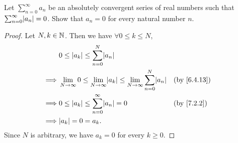 \begin{ex}\label{ex:7.3.3}
  Let \(\sum_{n = 0}^\infty a_n\) be an absolutely convergent series of real numbers such that \(\sum_{n = 0}^\infty \abs{a_n} = 0\).
  Show that \(a_n = 0\) for every natural number \(n\).
\end{ex}

\begin{proof}
  Let \(N, k \in \mathbb{N}\).
  Then we have \(\forall 0 \leq k \leq N\),
  \begin{align*}
             & 0 \leq \abs{a_k} \leq \sum_{n = 0}^N \abs{a_n}                                                                              \\
    \implies & \lim_{N \to \infty} 0 \leq \lim_{N \to \infty} \abs{a_k} \leq \lim_{N \to \infty} \sum_{n = 0}^N \abs{a_n} &  & \by{6.4.13} \\
    \implies & 0 \leq \abs{a_k} \leq \sum_{n = 0}^\infty \abs{a_n} = 0                                                    &  & \by{7.2.2}  \\
    \implies & \abs{a_k} = 0 = a_k.
  \end{align*}
  Since \(N\) is arbitrary, we have \(a_k = 0\) for every \(k \geq 0\).
\end{proof}
